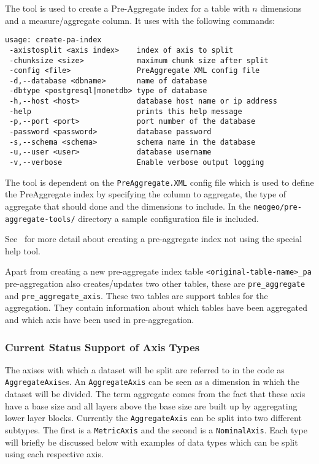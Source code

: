 The tool is used to create a Pre-Aggregate index for a table with $\textit{n}$ dimensions and a measure/aggregate column. It uses with the following commands:
\begin{lstlisting}[basicstyle=\small]
usage: create-pa-index
 -axistosplit <axis index>    index of axis to split
 -chunksize <size>            maximum chunk size after split
 -config <file>               PreAggregate XML config file
 -d,--database <dbname>       name of database
 -dbtype <postgresql|monetdb> type of database
 -h,--host <host>             database host name or ip address
 -help                        prints this help message
 -p,--port <port>             port number of the database
 -password <password>         database password
 -s,--schema <schema>         schema name in the database
 -u,--user <user>             database username
 -v,--verbose                 Enable verbose output logging
\end{lstlisting}
The tool is dependent on the \lstinline|PreAggregate.XML| config file which is used to define the PreAggregate index by specifying the column to aggregate, the type of aggregate that should done and the dimensions to include. In the \lstinline|neogeo/pre-aggregate-tools/| directory a sample configuration file is included.


See~ for more detail about creating a pre-aggregate index not using the special help tool.

Apart from creating a new pre-aggregate index table \lstinline|<original-table-name>_pa| pre-aggregation also creates/updates two other tables, these are \lstinline|pre_aggregate| and \lstinline|pre_aggregate_axis|. These two tables are support tables for the aggregation. They contain information about which tables have been aggregated and which axis have been used in pre-aggregation.

\subsubsection{Current Status Support of Axis Types}
The axises with which a dataset will be split are referred to in the code as \lstinline|AggregateAxis|es. An \lstinline|AggregateAxis| can be seen as a dimension in which the dataset will be divided. The term aggregate comes from the fact that these axis have a base size and all layers above the base size are built up by aggregating lower layer blocks. Currently the \lstinline|AggregateAxis| can be split into two different subtypes. The first is a \lstinline|MetricAxis| and the second is a \lstinline|NominalAxis|. Each type will briefly be discussed below with examples of data types which can be split using each respective axis.

